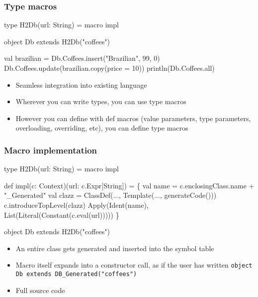 \documentclass[svgnames,hyperref={bookmarks=false}]{beamer}
\begin{document}
\begin{frame}[fragile]
\frametitle{Type macros}
\begin{semiverbatim}
type H2Db(url: String) = macro impl

object Db extends H2Db("coffees")

val brazilian = Db.Coffees.insert("Brazilian", 99, 0)
Db.Coffees.update(brazilian.copy(price = 10))
println(Db.Coffees.all)
\end{semiverbatim}

\vskip15pt

\begin{itemize}
\item Seamless integration into existing language
\item Wherever you can write types, you can use type macros
\item However you can define with def macros (value parameters, type parameters, overloading, overriding, etc), you can define type macros
\end{itemize}
\end{frame}

\begin{frame}[fragile]
\frametitle{Macro implementation}
\begin{semiverbatim}
type H2Db(url: String) = macro impl

def impl(c: Context)(url: c.Expr[String]) = \{
  val name = c.enclosingClass.name + "_Generated"
  val clazz = ClassDef(..., Template(..., generateCode()))
  c.introduceTopLevel(clazz)
  Apply(Ident(name), List(Literal(Constant(c.eval(url)))))
\}

object Db extends H2Db("coffees")
\end{semiverbatim}

\begin{itemize}
\item An entire class gets generated and inserted into the symbol table
\item Macro itself expands into a constructor call, as if the user has written \texttt{object Db extends DB\_Generated("coffees")}
\item Full source code 
\end{itemize}
\end{frame}
\end{document}
